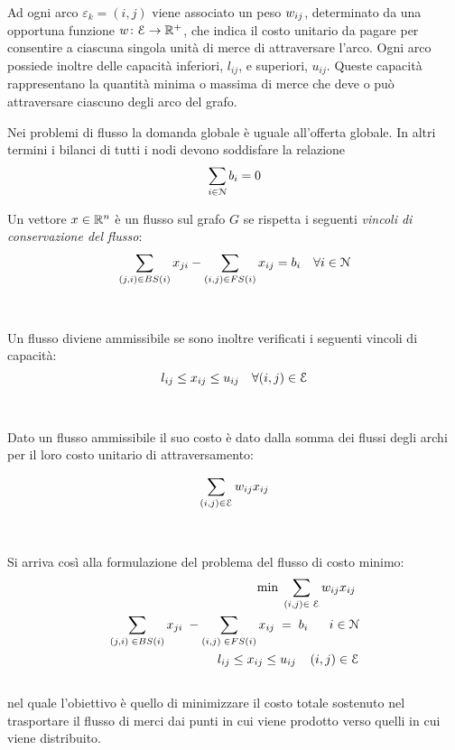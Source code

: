 Ad ogni arco $\varepsilon_k = (i,j)$ viene associato un peso $w_{ij}$, determinato da una opportuna funzione $w\colon \mathcal{E}\to\mathbb{R^{+}}$, che indica il costo unitario da pagare per consentire a ciascuna singola unità di merce di attraversare l'arco.
Ogni arco possiede inoltre delle capacità inferiori, $l_{ij}$, e superiori, $u_{ij}$.
Queste capacità rappresentano la quantità minima o massima di merce che deve o può attraversare ciascuno degli arco del grafo.

Nei problemi di flusso la domanda globale è uguale all'offerta globale. 
In altri termini i bilanci di tutti i nodi devono soddisfare la relazione
\begin{equation*}
\label{eqn:Bilancio}
\sum_{i \in \mathcal{N}} b_i = 0
\end{equation*}

Un vettore $x \in \mathbb{R}^n$ è un flusso sul grafo $G$ se rispetta i seguenti \emph{vincoli di conservazione del flusso}:
\begin{equation*}
\label{eqn:VincoliConservazioneFlusso}
\sum_{(j,i) \in BS(i)} x_{ji} - \sum_{(i,j) \in FS(i)} x_{ij} = b_i  \quad \forall i \in \mathcal{N}
\end{equation*}\\
\\
Un flusso diviene ammissibile se sono inoltre verificati i seguenti vincoli di capacità:
\begin{equation*}
l_{ij} \le x_{ij} \le u_{ij} \quad \forall (i,j) \in \mathcal{E}
\end{equation*}\\
\\
Dato un flusso ammissibile il suo costo è dato dalla somma dei flussi degli archi per il loro costo unitario di attraversamento:

\begin{equation*}
\sum_{(i,j)\in \mathcal{E}} w_{ij} x_{ij}\\
\end{equation*}\\
\\
Si arriva così alla formulazione del problema del flusso di costo minimo:
\begin{equation}
\label{eq:MCFex}
\begin{split}
\min \; \sum_{(i,j)\in \;\mathcal{E}}w_{ij}x_{ij} \; \\
\sum_{(j,i)\;\in BS(i)}x_{ji}\;-\sum_{(i,j)\;\in FS(i)}x_{ij}\;=\;b_i\;\;\;\;\;\;i\in \mathcal{N} \\
l_{ij}\leq x_{ij}\leq u_{ij} \; \; \; \; (i,j)\in \mathcal{E} \\
\end{split}
\end{equation}
\\
nel quale l'obiettivo è quello di minimizzare il costo totale sostenuto nel trasportare il flusso di merci dai punti in cui viene prodotto verso quelli in cui viene distribuito.\\
\\

